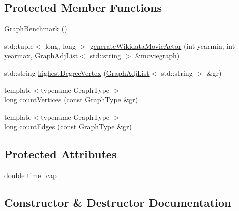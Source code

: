 \subsection*{Protected Member Functions}
\begin{DoxyCompactItemize}
\item 
\hyperlink{classbridges_1_1benchmark_1_1_graph_benchmark_a617520fd2675b1ec03eb4eaf30affa9d}{Graph\+Benchmark} ()
\item 
std\+::tuple$<$ long, long $>$ \hyperlink{classbridges_1_1benchmark_1_1_graph_benchmark_a561d704a89e9e824cc6b246266cf05d7}{generate\+Wikidata\+Movie\+Actor} (int yearmin, int yearmax, \hyperlink{classbridges_1_1datastructure_1_1_graph_adj_list}{Graph\+Adj\+List}$<$ std\+::string $>$ \&moviegraph)
\item 
std\+::string \hyperlink{classbridges_1_1benchmark_1_1_graph_benchmark_a68b899e43ab8afc17cbca344004f65fb}{highest\+Degree\+Vertex} (\hyperlink{classbridges_1_1datastructure_1_1_graph_adj_list}{Graph\+Adj\+List}$<$ std\+::string $>$ \&gr)
\item 
{\footnotesize template$<$typename Graph\+Type $>$ }\\long \hyperlink{classbridges_1_1benchmark_1_1_graph_benchmark_aa8496248acdb735f170f46ee66bdb4ce}{count\+Vertices} (const Graph\+Type \&gr)
\item 
{\footnotesize template$<$typename Graph\+Type $>$ }\\long \hyperlink{classbridges_1_1benchmark_1_1_graph_benchmark_a18fc383926e9067fc98506449c819d22}{count\+Edges} (const Graph\+Type \&gr)
\end{DoxyCompactItemize}
\subsection*{Protected Attributes}
\begin{DoxyCompactItemize}
\item 
double \hyperlink{classbridges_1_1benchmark_1_1_graph_benchmark_a59938016b721fb6db2ff8bdb2c9d41c1}{time\+\_\+cap}
\end{DoxyCompactItemize}


\subsection{Constructor \& Destructor Documentation}
\mbox{\label{classbridges_1_1benchmark_1_1_graph_benchmark_a617520fd2675b1ec03eb4eaf30affa9d}} 

